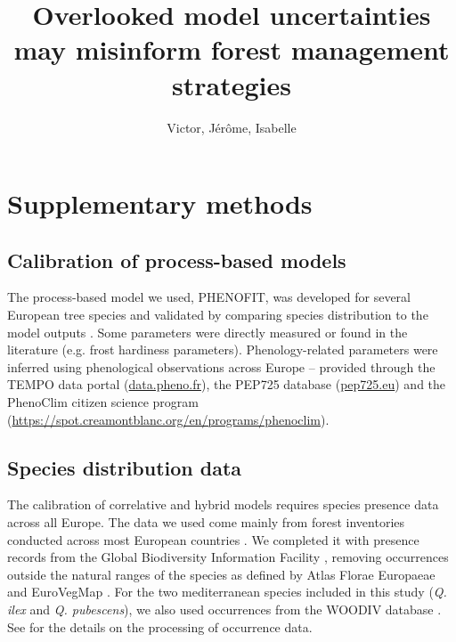 \documentclass[11pt,letter]{article}
\begin{document}
\title{Overlooked model uncertainties may misinform forest management strategies
}

\author{Victor, Jérôme, Isabelle}
\date{}
\maketitle 

\section*{Supplementary methods}

\subsection*{Calibration of process-based models}

The process-based model we used, PHENOFIT, was developed for several European tree species  and validated by comparing species distribution to the model outputs \citep{Saltre2013, Duputie2015, Gauzere2020, VanderMeersch2025}. Some parameters were directly measured or found in the literature (e.g. frost hardiness parameters). Phenology-related parameters were inferred using phenological observations across Europe -- provided through the TEMPO data portal (\url{data.pheno.fr}), the PEP725 database (\url{pep725.eu}) and the PhenoClim citizen science program (\url{https://spot.creamontblanc.org/en/programs/phenoclim}).

\subsection*{Species distribution data}

The calibration of correlative and hybrid models requires species presence data across all Europe. The data we used come mainly from forest inventories conducted across most European countries \citep{Mauri2017}. We completed it with presence records from the Global Biodiversity Information Facility \citep{GBIF2022}, removing occurrences outside the natural ranges of the species as defined by Atlas Florae Europaeae \citep{AFE2005} and EuroVegMap  \citep{EVM2003}. For the two mediterranean species included in this study (\emph{Q. ilex} and \emph{Q. pubescens}), we also used occurrences from the WOODIV database \citep{Monnet2021}. See \citet{VanderMeersch2025} for the details on the processing of occurrence data.
\end{document}
